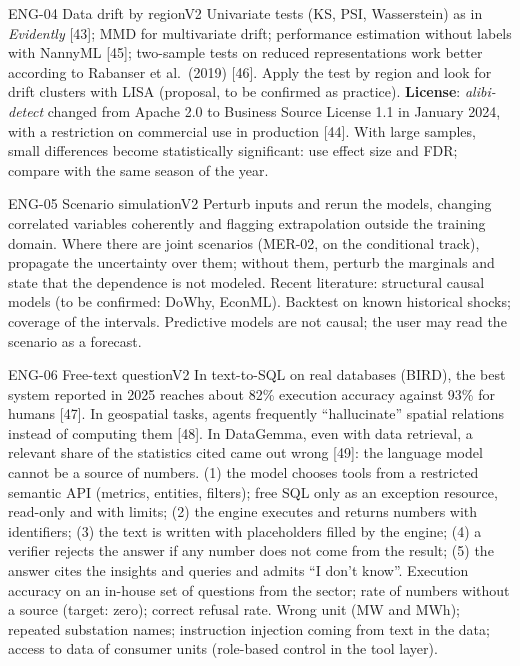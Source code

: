 \begin{ficha}{ENG-04 \textperiodcentered{} Data drift by region}{V2}
 Univariate tests (KS, PSI, Wasserstein) as in
\emph{Evidently} [43]; MMD for multivariate drift; performance estimation
without labels with NannyML [45]; two-sample tests on reduced
representations work better according to Rabanser et al.\ (2019) [46]. Apply the
test by region and look for drift clusters with LISA (proposal, to be
confirmed as practice).
 \textbf{License}: \emph{alibi-detect} changed from Apache 2.0
to Business Source License 1.1 in January 2024, with a restriction on commercial
use in production [44]. With large samples, small differences become statistically
significant: use
effect size and FDR; compare with the same season of the year.
\end{ficha}

\begin{ficha}{ENG-05 \textperiodcentered{} Scenario simulation}{V2}
 Perturb inputs and rerun the models, changing
correlated variables coherently and flagging extrapolation outside the
training domain. Where there are joint scenarios (MER-02, on the conditional
track), propagate the uncertainty over them; without them, perturb the
marginals and state that the dependence is not modeled.
Recent literature: structural causal models (to be confirmed: DoWhy, EconML).
 Backtest on known historical shocks; coverage of the
intervals.
 Predictive models are not causal; the user may read the
scenario as a forecast.
\end{ficha}

\begin{ficha}{ENG-06 \textperiodcentered{} Free-text question}{V2}
 In text-to-SQL on real databases (BIRD), the best
system reported in 2025 reaches about 82\% execution accuracy against 93\% for humans
[47]. In geospatial tasks, agents frequently ``hallucinate'' spatial
relations instead of computing them [48]. In DataGemma, even with data
retrieval, a relevant share of the statistics cited came out wrong [49]: the language
model cannot be a source of numbers.
 (1) the model chooses tools from a restricted
semantic API (metrics, entities, filters); free SQL only as an exception
resource, read-only and with limits; (2) the engine executes and returns numbers
with identifiers; (3) the text is written with placeholders filled by the
engine; (4) a verifier rejects the answer if any number does not come from the
result; (5) the answer cites the insights and queries and admits ``I don't know''.
 Execution accuracy on an in-house set of questions from the
sector; rate of numbers without a source (target: zero); correct refusal rate.
 Wrong unit (MW and MWh); repeated substation names;
instruction injection coming from text in the data; access to data of consumer
units (role-based control in the tool layer).
\end{ficha}

